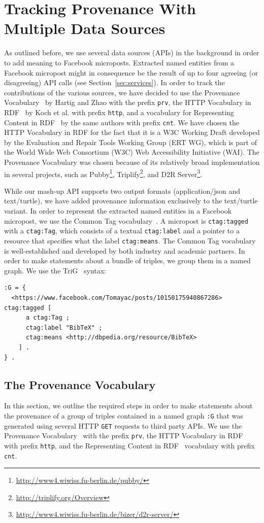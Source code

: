 \documentclass[conference]{IEEEtran}
\begin{document}
\section{Tracking Provenance With Multiple Data Sources}                    \label{sec:tracking}
As outlined before, we use several data sources (APIs) in the background in order to add meaning to Facebook microposts. Extracted named entities from a Facebook micropost might in consequence be the result of up to four agreeing (or disagreeing) API calls (see Section~\ref{sec:services}). In order to track the contributions of the various sources, we have decided to use the Provenance Vocabulary~\cite{Hartig:Provenance} by Hartig and Zhao with the prefix \texttt{prv}, the HTTP Vocabulary in RDF~\cite{HTTP:RDF} by Koch et al. with prefix \texttt{http}, and a vocabulary for Representing Content in RDF~\cite{CNT:RDF} by the same authors with prefix \texttt{cnt}. We have chosen the HTTP Vocabulary in RDF for the fact that it is a W3C Working Draft  developed by the Evaluation and Repair Tools Working Group (ERT WG), which is part of the World Wide Web Consortium (W3C) Web Accessibility Initiative (WAI). The Provenance Vocabulary was chosen because of its relatively broad implementation in several projects, such as Pubby\footnote{\url{http://www4.wiwiss.fu-berlin.de/pubby/}}, Triplify\footnote{\url{http://triplify.org/Overview}}, and D2R Server\footnote{\url{http://www4.wiwiss.fu-berlin.de/bizer/d2r-server/}}.

While our mash-up API supports two output formats (application/json and text/turtle), we have added provenance information exclusively to the text/turtle variant. In order to represent the extracted named entities in a Facebook micropost, we use the Common Tag vocabulary~\cite{CommonTag:Spec}. A micropost is \texttt{ctag:tagged} with a \texttt{ctag:Tag}, which consists of a textual \texttt{ctag:label} and a pointer to a resource that specifies what the label \texttt{ctag:means}. The Common Tag vocabulary is well-established and developed by both industry and academic partners. In order to make statements about a bundle of triples, we group them in a named graph. We use the TriG~\cite{Bizer:TriG} syntax:
\begin{lstlisting}
:G = {
  <https://www.facebook.com/Tomayac/posts/10150175940867286> ctag:tagged [
      a ctag:Tag ;
      ctag:label "BibTeX" ;
      ctag:means <http://dbpedia.org/resource/BibTeX>
    ] .
} .
\end{lstlisting}

\subsection{The Provenance Vocabulary}                                      \label{sec:provenance}
In this section, we outline the required steps in order to make statements about the provenance of a group of triples contained in a named graph \texttt{:G} that was generated using several HTTP \texttt{GET} requests to third party APIs. We use the Provenance Vocabulary~\cite{Hartig:Provenance} with the prefix \texttt{prv}, the HTTP Vocabulary in RDF~\cite{HTTP:RDF} with prefix \texttt{http}, and the Representing Content in RDF~\cite{CNT:RDF} vocabulary with prefix \texttt{cnt}.
\end{document}
